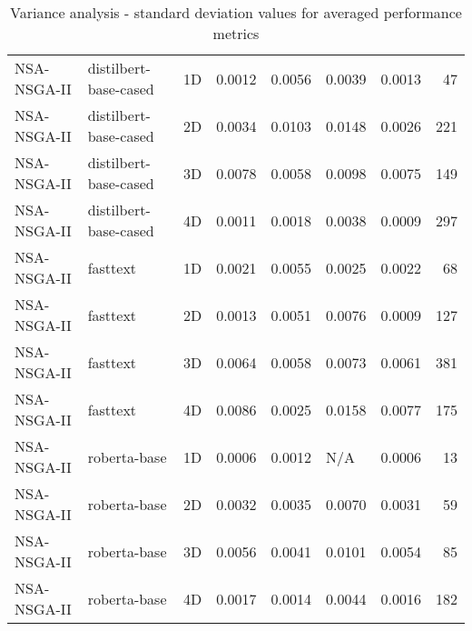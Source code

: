 \begin{table*}[h]
{\begin{tabular}{lllllllr}
NSA-NSGA-II & distilbert-base-cased & 1D & 0.0012 & 0.0056 & 0.0039 & 0.0013 & 47 \\
NSA-NSGA-II & distilbert-base-cased & 2D & 0.0034 & 0.0103 & 0.0148 & 0.0026 & 221 \\
NSA-NSGA-II & distilbert-base-cased & 3D & 0.0078 & 0.0058 & 0.0098 & 0.0075 & 149 \\
NSA-NSGA-II & distilbert-base-cased & 4D & 0.0011 & 0.0018 & 0.0038 & 0.0009 & 297 \\
NSA-NSGA-II & fasttext & 1D & 0.0021 & 0.0055 & 0.0025 & 0.0022 & 68 \\
NSA-NSGA-II & fasttext & 2D & 0.0013 & 0.0051 & 0.0076 & 0.0009 & 127 \\
NSA-NSGA-II & fasttext & 3D & 0.0064 & 0.0058 & 0.0073 & 0.0061 & 381 \\
NSA-NSGA-II & fasttext & 4D & 0.0086 & 0.0025 & 0.0158 & 0.0077 & 175 \\
NSA-NSGA-II & roberta-base & 1D & 0.0006 & 0.0012 & N/A & 0.0006 & 13 \\
NSA-NSGA-II & roberta-base & 2D & 0.0032 & 0.0035 & 0.0070 & 0.0031 & 59 \\
NSA-NSGA-II & roberta-base & 3D & 0.0056 & 0.0041 & 0.0101 & 0.0054 & 85 \\
NSA-NSGA-II & roberta-base & 4D & 0.0017 & 0.0014 & 0.0044 & 0.0016 & 182 \\
\bottomrule
\end{tabular}
    }
    \caption{Variance analysis - standard deviation values for averaged performance metrics}
    \label{tab:stdev_values}
\end{table*}
